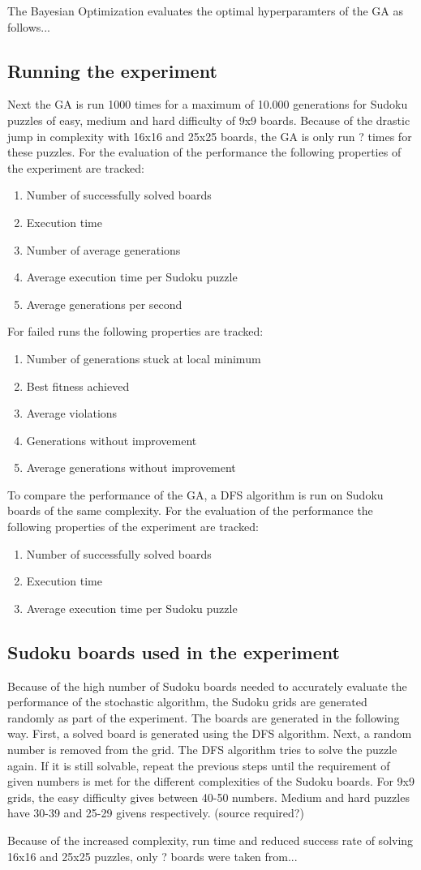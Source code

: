The Bayesian Optimization evaluates the optimal hyperparamters of the GA as follows...

\subsection{Running the experiment}
Next the GA is run 1000 times for a maximum of 10.000 generations for Sudoku puzzles of easy, medium and hard difficulty of 9x9 boards. Because of the drastic jump in complexity with 16x16 and 25x25 boards, the GA is only run ? times for these puzzles. For the evaluation of the performance the following properties of the experiment are tracked:
\begin{enumerate}
	\item Number of successfully solved boards
	\item Execution time
	\item Number of average generations
	\item Average execution time per Sudoku puzzle
	\item Average generations per second
\end{enumerate}

For failed runs the following properties are tracked:
\begin{enumerate}
	\item Number of generations stuck at local minimum
	\item Best fitness achieved
	\item Average violations
	\item Generations without improvement
	\item Average generations without improvement
\end{enumerate}

To compare the performance of the GA, a DFS algorithm is run on Sudoku boards of the same complexity. For the evaluation of the performance the following properties of the experiment are tracked:
\begin{enumerate}
	\item Number of successfully solved boards
	\item Execution time
	\item Average execution time per Sudoku puzzle
\end{enumerate}

\subsection{Sudoku boards used in the experiment}
Because of the high number of Sudoku boards needed to accurately evaluate the performance of the stochastic algorithm, the Sudoku grids are generated randomly as part of the experiment. The boards are generated in the following way. 
First, a solved board is generated using the DFS algorithm. Next, a random number is removed from the grid. The DFS algorithm tries to solve the puzzle again. If it is still solvable, repeat the previous steps until the requirement of given numbers is met for the different complexities of the Sudoku boards. For 9x9 grids, the easy difficulty gives between 40-50 numbers. Medium and hard puzzles have 30-39 and 25-29 givens respectively. (source required?)

Because of the increased complexity, run time and reduced success rate of solving 16x16 and 25x25 puzzles, only ? boards were taken from...